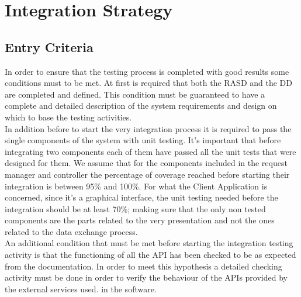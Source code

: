 \documentclass[a4paper,10pt]{article}
\begin{document}
\section{Integration Strategy}
\subsection{Entry Criteria}
In order to ensure that the testing process is completed with good results some conditions must to be met. At first is required that both the RASD and the DD are 
completed and defined. This condition must be guaranteed to have a complete and detailed description of the system requirements and 
design on which to base the testing activities. \\
In addition before to start the very integration process it is required to pass the single components of the system with unit testing. It's important that before integrating 
two components each of them have passed all the unit tests that were designed for them. We assume that for the components included in the request manager and controller
the percentage of coverage reached before starting their integration is between 95\% and 100\%.
For what the Client Application is concerned, since it's a graphical interface, the unit testing needed before the integration should be at least 70\%; making sure that 
the only non tested components are the parts related to the very presentation and not the ones related to the data exchange process.
\\An additional condition that must be met before starting the integration testing activity is that the functioning of all the API has been checked to be as expected from
the documentation. In order to meet this hypothesis a detailed checking activity must be done in order 
to verify the behaviour of the APIs provided by the external services used. 
in the software.
\end{document}
